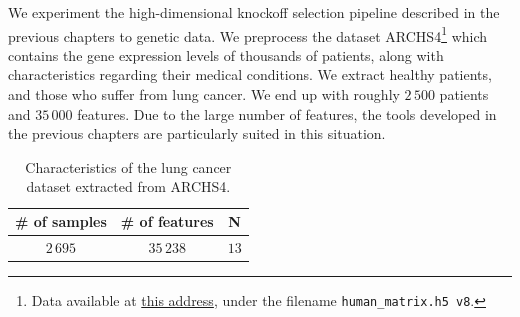 We experiment the high-dimensional knockoff selection pipeline
described in the previous chapters to genetic data.
We preprocess the dataset ARCHS4\footnote{
    Data available at \href{https://amp.pharm.mssm.edu/archs4/download.html}{this address},
    under the filename \texttt{human\_matrix.h5 v8}.
}
which contains the gene expression levels of thousands of patients,
along with characteristics regarding their medical conditions.
We extract healthy patients,
and those who suffer from lung cancer.
We end up with roughly $2\,500$ patients and $35\,000$ features.
Due to the large number of features,
the tools developed in the previous chapters are particularly suited in this situation.
\begin{table}[!htb]
    \centering
    \setlength{\tabcolsep}{2pt}
    {\small
        \begin{tabular}{|c|c|c|}\hline
        \textbf{\# of samples} & \textbf{\# of features} & \textbf{N}\\ \hline
        $2\,695$ & $35\,238$  & $13$\\ \hline
        \end{tabular}
    }%
    \caption[short]{
        Characteristics of the lung cancer dataset extracted from ARCHS4.
    }
    \label{tab:archs4_dataset}
\end{table}

